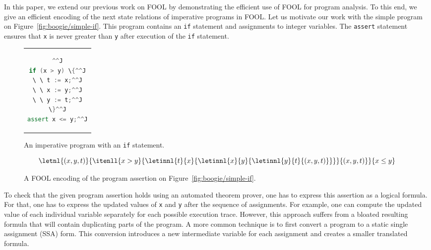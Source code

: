 In this paper, we extend our previous work on FOOL by demonstrating the efficient use of FOOL for program analysis. To this end, we give an efficient encoding of the next state relations of imperative programs in FOOL. Let us motivate our work with the simple program on Figure~\ref{fig:boogie/simple-if}. This program contains an \verb'if' statement and assignments to integer variables. The \verb'assert' statement ensures that \verb'x' is never greater than \verb'y' after execution of the \verb'if' statement.

\begin{figure}
  \parbox{4.6cm}{
    \vspace{1.35em}
    \begin{center}
    \begin{tabular}{c}
    \begin{lstlisting}[language=cpp]^^J
if (x > y) \{^^J
\ \ t := x;^^J
\ \ x := y;^^J
\ \ y := t;^^J
\}^^J
assert x <= y;^^J
    \end{lstlisting}
    \end{tabular}
    \end{center}
    \vspace{1em}
    \caption{An imperative program with an \texttt{if} statement.}
    \label{fig:boogie/simple-if}
  }
\qquad
  \begin{minipage}{6cm}
\[
  \letnl{(x,y,t)}{\itenll{x > y}
                 {\letinnl{t}{x}
                          {\letinnl{x}{y}
                                   {\letinnl{y}{t}
                                            {(x,y,t)}}}}
                 {(x,y,t)}}
        {x \le y}
\]
    \caption{A FOOL encoding of the program assertion on Figure~\ref{fig:boogie/simple-if}.}
    \label{fig:boogie/simple-if-fool}
  \end{minipage}
\end{figure}

To check that the given program assertion holds using an automated theorem prover, one has to express this assertion as a logical formula. For that, one has to express the updated values of \verb'x' and \verb'y' after the sequence of assignments. For example, one can compute the updated value of each individual variable separately for each possible execution trace. However, this approach suffers from a bloated resulting formula that will contain duplicating parts of the program. A more common technique is to first convert a program to a static single assignment (SSA) form. This conversion introduces a new intermediate variable for each assignment and creates a smaller translated formula.

